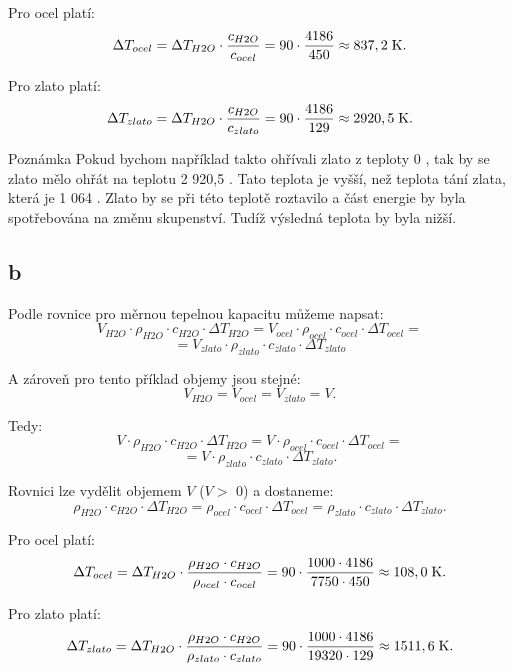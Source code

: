 \documentclass{article}
\begin{document}
Pro ocel platí:
$$
    \Delta T_{ocel} = \Delta T_{H2O} \cdot \frac{c_{H2O}}{c_{ocel}} = 90 \cdot \frac{4 186}{450} \approx 837,2 \; \textrm{K}.
$$

Pro zlato platí:
$$
    \Delta T_{zlato} = \Delta T_{H2O} \cdot \frac{c_{H2O}}{c_{zlato}} = 90 \cdot \frac{4 186}{129} \approx 2 920,5 \; \textrm{K}.
$$

\begin{notebox}{Poznámka}
    Pokud bychom například takto ohřívali zlato z teploty 0 \ueqCELS, tak by se zlato mělo ohřát na teplotu 2 920,5 \ueqCELS. Tato teplota je vyšší, než teplota tání zlata, která je 1 064 \ueqCELS. Zlato by se při této teplotě roztavilo a část energie by byla spotřebována na změnu skupenství. Tudíž výsledná teplota by byla nižší.
\end{notebox}



\subsection{b}

Podle rovnice pro měrnou tepelnou kapacitu můžeme napsat:
$$
    V_{H2O} \cdot \rho_{H2O} \cdot c_{H2O} \cdot \Delta T_{H2O} = V_{ocel} \cdot \rho_{ocel} \cdot c_{ocel} \cdot \Delta T_{ocel} =
$$
$$
    = V_{zlato} \cdot \rho_{zlato} \cdot c_{zlato} \cdot \Delta T_{zlato}
$$

A zároveň pro tento příklad objemy jsou stejné:
$$
    V_{H2O} = V_{ocel} = V_{zlato} = V.
$$

Tedy:
$$
    V \cdot \rho_{H2O} \cdot c_{H2O} \cdot \Delta T_{H2O} = V \cdot \rho_{ocel} \cdot c_{ocel} \cdot \Delta T_{ocel} =
$$
$$
    =  V \cdot \rho_{zlato} \cdot c_{zlato} \cdot \Delta T_{zlato}.
$$

Rovnici lze vydělit objemem $V$ ($V >$ 0) a dostaneme:
$$
    \rho_{H2O} \cdot c_{H2O} \cdot \Delta T_{H2O} = \rho_{ocel} \cdot c_{ocel} \cdot \Delta T_{ocel} = \rho_{zlato} \cdot c_{zlato} \cdot \Delta T_{zlato}.
$$

Pro ocel platí:
$$
    \Delta T_{ocel} = \Delta T_{H2O} \cdot \frac{\rho_{H2O} \cdot c_{H2O}}{\rho_{ocel} \cdot c_{ocel}} = 90 \cdot \frac{1 000 \cdot 4 186}{7 750 \cdot 450} \approx 108,0 \; \textrm{K}.
$$

Pro zlato platí:
$$
    \Delta T_{zlato} = \Delta T_{H2O} \cdot \frac{\rho_{H2O} \cdot c_{H2O}}{\rho_{zlato} \cdot c_{zlato}} = 90 \cdot \frac{1 000 \cdot 4 186}{19 320 \cdot 129} \approx 1511,6 \; \textrm{K}.
$$

\newpage
\end{document}
